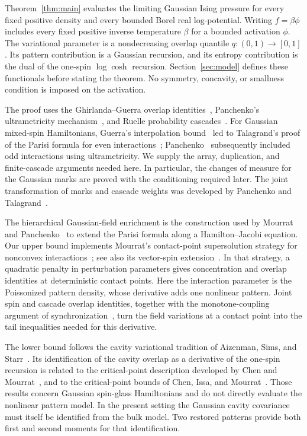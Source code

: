 Theorem~\ref{thm:main} evaluates the limiting Gaussian Ising pressure for
every fixed positive density and every bounded Borel real log-potential.
Writing $f=\beta\phi$ includes every fixed positive inverse temperature
$\beta$ for a bounded activation $\phi$. The variational parameter is a
nondecreasing overlap quantile $q:(0,1)\to[0,1]$. Its pattern contribution
is a Gaussian recursion, and its entropy contribution is the dual of the
one-spin $\log\cosh$ recursion. Section~\ref{sec:model} defines these
functionals before stating the theorem. No symmetry, concavity, or
smallness condition is imposed on the activation.

The proof uses the Ghirlanda--Guerra overlap
identities~\cite{gg1998}, Panchenko's ultrametricity
mechanism~\cite{panchenko2013}, and Ruelle probability
cascades~\cite{ruelle1987}. For Gaussian mixed-spin Hamiltonians,
Guerra's interpolation bound~\cite{guerra2003} led to Talagrand's proof
of the Parisi formula for even interactions~\cite{talagrand2006parisi};
Panchenko~\cite{panchenko2014parisi} subsequently included odd interactions
using ultrametricity.
We supply the array, duplication, and finite-cascade arguments needed
here. In particular, the changes of measure for the Gaussian marks are
proved with the conditioning required later. The joint transformation of
marks and cascade weights was developed by Panchenko and
Talagrand~\cite{panchenkotalagrand2007property,panchenkotalagrand2007interpolation}.

The hierarchical Gaussian-field enrichment is the construction used by
Mourrat and Panchenko~\cite{mourratpanchenko2020} to extend the Parisi
formula along a Hamilton--Jacobi equation. Our upper bound implements
Mourrat's contact-point supersolution strategy for nonconvex
interactions~\cite[Section~4]{mourrat2021}; see also its vector-spin
extension~\cite{mourrat2023upper}. In that strategy, a quadratic penalty
in perturbation parameters gives concentration and overlap identities
at deterministic contact points. Here the interaction parameter is the
Poissonized pattern density, whose derivative adds one nonlinear pattern.
Joint spin and cascade overlap identities, together with the
monotone-coupling argument of
synchronization~\cite{panchenko2015multispecies}, turn the field variations
at a contact point into the tail inequalities needed for this derivative.

The lower bound follows the cavity variational tradition of Aizenman,
Sims, and Starr~\cite{aizenmansimsstarr2003}. Its identification of the
cavity overlap as a derivative of the one-spin recursion is related to
the critical-point description developed by Chen and
Mourrat~\cite{chenmourrat2025}, and to the critical-point bounds of Chen,
Issa, and Mourrat~\cite[Section~6]{chenissamourrat2026}. Those results
concern Gaussian spin-glass Hamiltonians and do not directly evaluate the
nonlinear pattern model. In the present setting the Gaussian cavity
covariance must itself be identified from the bulk model. Two restored
patterns provide both first and second moments for that identification.

